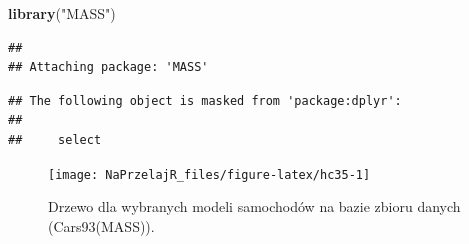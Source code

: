 \documentclass[polish,]{book}
\newenvironment{Shaded}{\begin{snugshade}}{\end{snugshade}}
\newcommand{\ControlFlowTok}[1]{\textcolor[rgb]{0.13,0.29,0.53}{\textbf{#1}}}
\newcommand{\DataTypeTok}[1]{\textcolor[rgb]{0.13,0.29,0.53}{#1}}
\newcommand{\DecValTok}[1]{\textcolor[rgb]{0.00,0.00,0.81}{#1}}
\newcommand{\KeywordTok}[1]{\textcolor[rgb]{0.13,0.29,0.53}{\textbf{#1}}}
\newcommand{\NormalTok}[1]{#1}
\newcommand{\OperatorTok}[1]{\textcolor[rgb]{0.81,0.36,0.00}{\textbf{#1}}}
\newcommand{\StringTok}[1]{\textcolor[rgb]{0.31,0.60,0.02}{#1}}
\begin{document}
\begin{Shaded}
\begin{Highlighting}[]
\KeywordTok{library}\NormalTok{(}\StringTok{"MASS"}\NormalTok{)}
\end{Highlighting}
\end{Shaded}

\begin{verbatim}
## 
## Attaching package: 'MASS'
\end{verbatim}

\begin{verbatim}
## The following object is masked from 'package:dplyr':
## 
##     select
\end{verbatim}

\begin{Shaded}
\end{Shaded}

\begin{figure}[h]

{\centering \texttt{[image: NaPrzelajR\_files/figure-latex/hc35-1]} 

}

\caption{Drzewo dla wybranych modeli samochodów na bazie zbioru danych (Cars93(MASS)).}\label{fig:hc35}
\end{figure}
\end{document}
